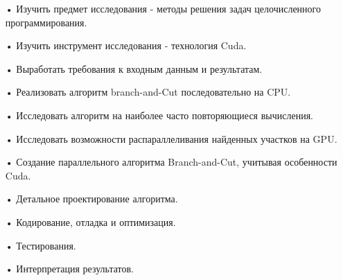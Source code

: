 \documentclass[a4paper,14pt,russian]{extreport}
\begin{document}
\begin{itemize}
\item[•] Изучить предмет исследования - методы решения задач целочисленного программирования.
\item[•] Изучить инструмент исследования - технология Cuda.
\item[•] Выработать требования к входным данным и результатам.
\item[•] Реализовать алгоритм branch-and-Cut последовательно на CPU.
\item[•] Исследовать алгоритм на наиболее часто повторяющиеся вычисления.
\item[•] Исследовать возможности распараллеливания найденных участков на GPU.
\item[•] Создание параллельного алгоритма Branch-and-Cut, учитывая особенности Cuda.
\item[•] Детальное проектирование алгоритма.
\item[•] Кодирование, отладка и оптимизация.
\item[•] Тестирования.
\item[•] Интерпретация результатов.
\end{itemize}
\end{document}
